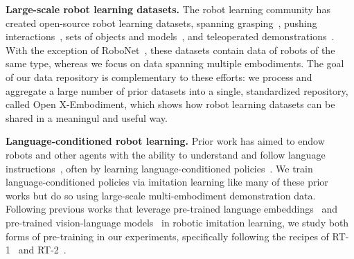 \documentclass[letterpaper, 10 pt, conference]{ieeeconf}  %
\newcommand{\repo}{Open X-Embodiment\xspace}     %
\begin{document}
\noindent \textbf{Large-scale robot learning datasets.} The robot learning community has created open-source robot learning datasets, spanning grasping~\cite{jiang2011efficient,Pinto2015SupersizingSL,bohg2015dataset,Mahler2017DexNet2D,depierre2018jacquard,levine2018learning,kalashnikov2018qt,Brahmbhatt2019,fang2020graspnet,acronym2020,bousmalis2018grasping,zhu2023fanuc}, pushing interactions~\cite{yu2016more,finn2017deep,ebert2018visual,dasari2019robonet}, sets of objects and models~\cite{shilane_princeton_2004,wohlkinger_3dnet_2012,kit2012,singh_bigbird_2014,Calli2015YCB,zhirong_wu_3d_2015,xiang_objectnet3d_2016,morrison2020egad,gao2021objectfolder,downs2022google,kalashnikov2021mt}, and teleoperated demonstrations~\cite{DBLP:journals/corr/abs-1811-02790,sharma2018multiple,mandlekar2019scaling,ebert2021bridge,robomimic2021,brohan2023rt1,lynch2023interactive,fang2023rh20t,roboagent,heo2023furniturebench,walke2023bridgedata}. With the exception of RoboNet~\cite{dasari2019robonet}, these datasets contain data of robots of the same type,
whereas we focus on data spanning multiple embodiments. The goal of our data repository is complementary to these efforts: we process and aggregate a large number of prior datasets into a single, standardized repository, called \repo, which shows how robot learning datasets can be shared in a meaningul and useful way. 

\noindent \textbf{Language-conditioned robot learning.} Prior work has aimed to endow robots and other agents with the ability to understand and follow language instructions~\cite{WINOGRAD19721,macmahon2006, kollar2010,chen2011,duvallet2015,Luketina2019ASO}, often by learning language-conditioned policies~\cite{shao2020concept,stepputtis2020language, nair2022learning,mees2022calvin,mees2022matters,jang2022bc,shridhar2022perceiver,brohan2023rt1}. We train language-conditioned policies via imitation learning like many of these prior works but do so using large-scale multi-embodiment demonstration data. Following previous works that leverage pre-trained language embeddings~\cite{hill2020human,shao2020concept,lynch2021grounding,nair2022learning,jang2022bc,ahn2022saycan,jiang2022vima,brohan2023rt1,vemprala2023chatgpt,huang2023voxposer} and pre-trained vision-language models~\cite{shridhar2022cliport,stone2023moo,mu2023embodiedgpt,brohan2023rt2} in robotic imitation learning, we study both forms of pre-training in our experiments, specifically following the recipes of RT-1~\cite{brohan2023rt1} and RT-2~\cite{brohan2023rt2}.
\end{document}
